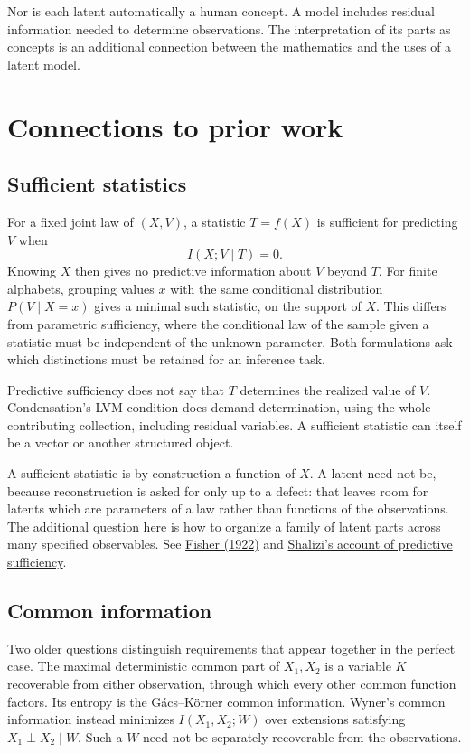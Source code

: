 \documentclass[10pt]{article}
\begin{document}
Nor is each latent automatically a human concept. A model includes residual
information needed to determine observations. The interpretation of its parts
as concepts is an additional connection between the mathematics and the uses of
a latent model.

\section{Connections to prior work}
\subsection{Sufficient statistics}
For a fixed joint law of $(X,V)$, a statistic $T=f(X)$ is sufficient for predicting
$V$ when
\[
 I(X;V\mid T)=0.
\]
Knowing $X$ then gives no predictive information about $V$ beyond $T$.
For finite alphabets, grouping values $x$ with the same conditional distribution
$P(V\mid X=x)$ gives a minimal such statistic, on the support of $X$.
This differs from parametric sufficiency, where the conditional law of
the sample given a statistic must be independent of the unknown parameter.
Both formulations ask which distinctions must be retained for an inference task.

Predictive sufficiency does not say that $T$ determines the realized value of
$V$. Condensation's LVM condition does demand determination, using the whole
contributing collection, including residual variables. A sufficient
statistic can itself be a vector or another structured object.

A sufficient statistic is by construction a function of $X$. A latent need not
be, because reconstruction is asked for only up to a defect: that leaves room
for latents which are parameters of a law rather than functions of the
observations. The additional
question here is how to organize a family of latent parts across many specified
observables. See \href{https://www.stats.org.uk/statistical-inference/Fisher1922.pdf}{Fisher (1922)}
and \href{https://www.stat.cmu.edu/~cshalizi/dm/19/lectures/17/lecture-17.html}{Shalizi's account of predictive sufficiency}.

\subsection{Common information}
Two older questions distinguish requirements that appear together in the
perfect case. The maximal deterministic common part of $X_1,X_2$ is a variable
$K$ recoverable from either observation, through which every other common
function factors. Its entropy is the G\'acs--K\"orner common information.
Wyner's common information instead minimizes $I(X_1,X_2;W)$ over extensions
satisfying $X_1\perp X_2\mid W$. Such a $W$ need not be separately recoverable
from the observations.
\end{document}
